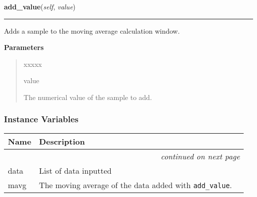     \vspace{0.5ex}

\hspace{.8\funcindent}\begin{boxedminipage}{\funcwidth}

    \raggedright \textbf{add\_value}(\textit{self}, \textit{value})

    \vspace{-1.5ex}

    \rule{\textwidth}{0.5\fboxrule}
\setlength{\parskip}{2ex}
    Adds a sample to the moving average calculation window.

\setlength{\parskip}{1ex}
      \textbf{Parameters}
      \vspace{-1ex}

      \begin{quote}
        \begin{Ventry}{xxxxx}

          \item[value]

          The numerical value of the sample to add.

        \end{Ventry}

      \end{quote}

    \end{boxedminipage}



  \subsubsection{Instance Variables}

    \vspace{-1cm}
\hspace{\varindent}\begin{longtable}{|p{\varnamewidth}|p{\vardescrwidth}|l}
\cline{1-2}
\cline{1-2} \centering \textbf{Name} & \centering \textbf{Description}& \\
\cline{1-2}
\endhead\cline{1-2}\multicolumn{3}{r}{\small\textit{continued on next page}}\\\endfoot\cline{1-2}
\endlastfoot\raggedright d\-a\-t\-a\- & List of data inputted&\\
\cline{1-2}
\raggedright m\-a\-v\-g\- & The moving average of the data added with \texttt{add\_value}.&\\
\cline{1-2}
\end{longtable}

